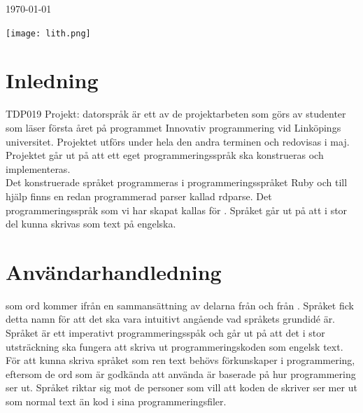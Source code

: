 \documentclass{article}
\begin{document}
\begin{titlepage}
	
	
	\vfill\vfill\vfill %
	
	{\large\today} %
	
	
	\vfill\vfill
	\texttt{[image: lith.png]}\\[1cm] %
	 
	
	\vfill %
	
\end{titlepage}

\newpage
\tableofcontents
\newpage

\section{Inledning}
TDP019 Projekt: datorspråk är ett av de projektarbeten som görs av studenter som läser första året på programmet Innovativ programmering vid Linköpings universitet. Projektet utförs under hela den andra terminen och redovisas i maj. Projektet går ut på att ett eget programmeringsspråk ska konstrueras och implementeras. \\ \newline 
Det konstruerade språket programmeras i programmeringsspråket Ruby och till hjälp finns en redan programmerad parser kallad rdparse. Det programmeringsspråk som vi har skapat kallas för . Språket går ut på att i stor del kunna skrivas som  text på engelska. 

\section{Användarhandledning}
 som ord kommer ifrån en sammansättning av delarna  från  och  från . Språket fick detta namn för att det ska vara intuitivt angående vad språkets grundidé är. Språket är ett imperativt programmeringsspåk och går ut på att det i stor utsträckning ska fungera att skriva ut programmeringskoden som engelsk text. För att kunna skriva språket som ren text behövs förkunskaper i programmering, eftersom de ord som är godkända att använda är baserade på hur  programmering ser ut. Språket riktar sig mot de personer som vill att koden de skriver ser mer ut som normal text än kod i sina programmeringsfiler.
\end{document}
